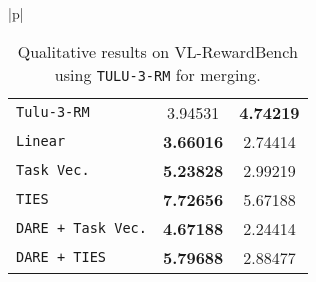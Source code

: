 \begin{table*}[hbtp]
\begin{center}
\begin{tabular}{|p{\textwidth}|}
\begin{center}
\begin{tabular}{|l|c|c|}
                \hline
                \texttt{Tulu-3-RM} & 3.94531 & \textbf{4.74219} \\
                \texttt{Linear} & \textbf{3.66016} & 2.74414 \\
                \texttt{Task Vec.} & \textbf{5.23828} & 2.99219 \\
                \texttt{TIES} & \textbf{7.72656} & 5.67188 \\
                \texttt{DARE + Task Vec.} & \textbf{4.67188} & 2.24414 \\
                \texttt{DARE + TIES} & \textbf{5.79688} & 2.88477 \\
                \hline
            \end{tabular} \\
        \end{center} \\
        \hline
        \end{tabular}
    \end{center}
    \caption{Qualitative results on VL-RewardBench using \texttt{TULU-3-RM} for merging.} 
    \label{tab:qualitative_results_4}
\end{table*}